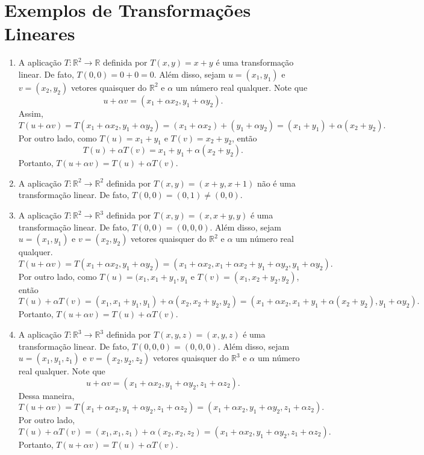 \vspace{0.3cm}

\section{Exemplos de Transformações Lineares}
\begin{enumerate}
\item A aplicação $T: \mathbb{R}^2 \rightarrow \mathbb{R}$ definida por $T(x,y)=x+y$ é uma transformação linear. De fato, $T(0,0)=0+0=0$. Além disso, sejam $u=(x_1,y_1)$ e $v=(x_2,y_2)$ vetores quaisquer do $\mathbb{R}^2$ e $\alpha$ um  número real qualquer. Note que $$u+ \alpha v=(x_1+\alpha x_2, y_1+\alpha y_2). $$  Assim,  $$T(u+\alpha v)=T(x_1+\alpha x_2, y_1+\alpha y_2)=(x_1+\alpha x_2)+ (y_1+\alpha y_2)=(x_1+y_1)+\alpha ( x_2+y_2).$$ Por outro lado, como $T(u)= x_1+y_1$ e $T(v)=x_2+y_2$, então  $$T(u)+ \alpha T(v)= x_1+y_1+ \alpha(x_2+y_2).$$ Portanto,
$ T(u+\alpha v)= T(u)+ \alpha T(v)$.

\item A aplicação $T: \mathbb{R}^2 \rightarrow \mathbb{R}^2$ definida por $T(x,y)=(x+y, x+1)$ não  é uma transformação linear. De fato, $T(0,0)=(0,1) \neq (0,0)$.

\item A aplicação $T: \mathbb{R}^2 \rightarrow \mathbb{R}^3$ definida por $T(x,y)=(x,x+y,y)$ é uma transformação linear. De fato, $T(0,0)=(0,0,0)$. Além disso, sejam $u=(x_1,y_1)$ e $v=(x_2,y_2)$ vetores quaisquer do $\mathbb{R}^2$ e $\alpha$ um  número real qualquer.  $$T(u+\alpha v)=T(x_1+\alpha x_2, y_1+\alpha y_2)=(x_1+\alpha x_2, x_1+\alpha x_2+ y_1+\alpha y_2,  y_1+\alpha y_2). $$ Por outro lado,   como $T(u)=(x_1,x_1+y_1,y_1$ e $T(v)=(x_1, x_2+y_2, y_2)$, então    $$T(u)+\alpha T(v)=(x_1, x_1+y_1, y_1)+\alpha ( x_2,  x_2+y_2, y_2)=(x_1+\alpha  x_2, x_1+y_1+ \alpha ( x_2+ y_2), y_1 + \alpha y_2).$$   Portanto, $T(u+\alpha v)=T(u)+\alpha T(v).$

\item A aplicação $T: \mathbb{R}^3 \rightarrow \mathbb{R}^3$ definida por $T(x,y, z)=(x,y,z)$ é uma transformação linear. De fato, $T(0,0, 0)=(0,0,0)$. Além disso, sejam $u=(x_1,y_1, z_1)$ e $v=(x_2,y_2, z_2)$ vetores quaisquer do $\mathbb{R}^3$ e $\alpha$ um  número real qualquer.  Note que $$u+ \alpha v=(x_1+\alpha x_2, y_1+\alpha y_2, z_1+\alpha z_2). $$
Dessa  maneira,
 $$T(u+\alpha v)=T(x_1+\alpha x_2, y_1+\alpha y_2, z_1+\alpha z_2)=(x_1+\alpha x_2, y_1+\alpha y_2, z_1+\alpha z_2). $$ Por outro lado, $$T(u)+\alpha T(v)=(x_1, x_1, z_1)+\alpha ( x_2,  x_2, z_2)=(x_1+\alpha x_2, y_1+\alpha y_2, z_1+\alpha z_2).$$ Portanto, $ T(u+\alpha v)=T(u)+\alpha T(v)$.


\end{enumerate}
